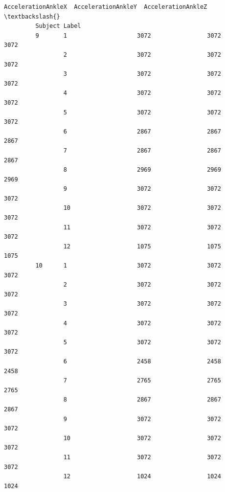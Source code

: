 \documentclass[11pt]{article}
\begin{document}
\begin{Verbatim}[commandchars=\\\{\}]
                        AccelerationAnkleX  AccelerationAnkleY  AccelerationAnkleZ  \textbackslash{}
         Subject Label                                                               
         9       1                    3072                3072                3072   
                 2                    3072                3072                3072   
                 3                    3072                3072                3072   
                 4                    3072                3072                3072   
                 5                    3072                3072                3072   
                 6                    2867                2867                2867   
                 7                    2867                2867                2867   
                 8                    2969                2969                2969   
                 9                    3072                3072                3072   
                 10                   3072                3072                3072   
                 11                   3072                3072                3072   
                 12                   1075                1075                1075   
         10      1                    3072                3072                3072   
                 2                    3072                3072                3072   
                 3                    3072                3072                3072   
                 4                    3072                3072                3072   
                 5                    3072                3072                3072   
                 6                    2458                2458                2458   
                 7                    2765                2765                2765   
                 8                    2867                2867                2867   
                 9                    3072                3072                3072   
                 10                   3072                3072                3072   
                 11                   3072                3072                3072   
                 12                   1024                1024                1024   
         

\end{Verbatim}
\end{document}
